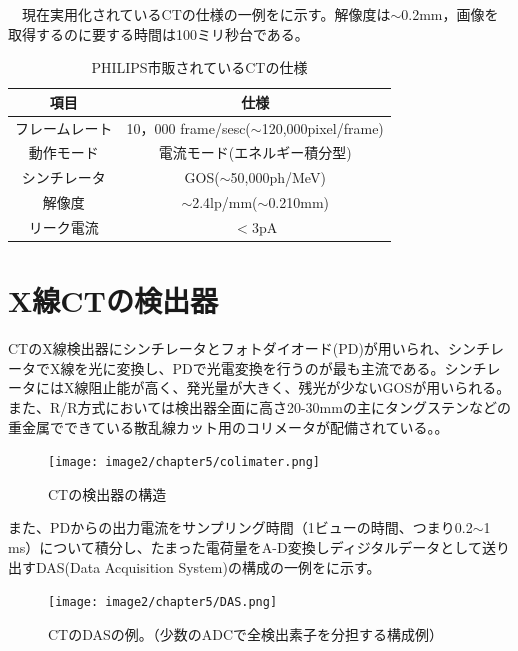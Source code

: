 \ \ 現在実用化されているCTの仕様の一例をに示す。解像度は$\sim$0.2mm，画像を取得するのに要する時間は100ミリ秒台である。
\begin{table}[H]
\begin{center}
\begin{tabular}{cc} \hline
項目 & 仕様 \\\hline
フレームレート & 10，000 frame/sesc($\sim$120,000pixel/frame) \\
動作モード & 電流モード(エネルギー積分型) \\
シンチレータ & GOS($\sim$50,000ph/MeV) \\
解像度 & $\sim$2.4lp/mm($\sim$0.210mm) \\
リーク電流 & $<3$pA \\\hline
\end{tabular}
\end{center}
\caption{PHILIPS市販されているCTの仕様\cite{philips}}
\label{CT_philips}
\end{table}



\section{X線CTの検出器}
CTのX線検出器にシンチレータとフォトダイオード(PD)が用いられ、シンチレータでX線を光に変換し、PDで光電変換を行うのが最も主流である。シンチレータにはX線阻止能が高く、発光量が大きく、残光が少ないGOSが用いられる。また、R/R方式においては検出器全面に高さ20-30mmの主にタングステンなどの重金属でできている散乱線カット用のコリメータが配備されている。。

\begin{figure}[H]
 \begin{center}
 \texttt{[image: image2/chapter5/colimater.png]} 
 \end{center}
 \caption{CTの検出器の構造}
 \label{fig:colimater}
\end{figure}

また、PDからの出力電流をサンプリング時間（1ビューの時間、つまり0.2$\sim$1 ms）について積分し、たまった電荷量をA-D変換しディジタルデータとして送り出すDAS(Data Acquisition System)の構成の一例をに示す。

\begin{figure}[H]
 \begin{center}
 \texttt{[image: image2/chapter5/DAS.png]} 
 \end{center}
 \caption{CTのDASの例。（少数のADCで全検出素子を分担する構成例）}
 \label{fig:DAS}
\end{figure}



